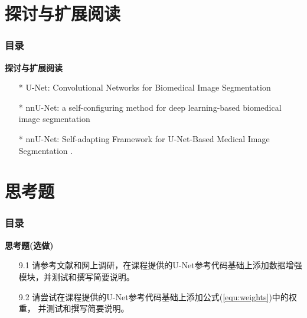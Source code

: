 \documentclass{beamer}%
\begin{document}
\section{探讨与扩展阅读}
\begin{frame}[allowframebreaks]
    \frametitle{\textsc{目录}} \vspace{-0.3cm}
    \begin{spacing}{0.0}
    \end{spacing}   %
\end{frame}


\begin{frame}[allowframebreaks]
    \vspace{-0.1cm}
    {\noindent\large\textbf{探讨与扩展阅读}}
    \vspace{0.4cm}
    \begin{itemize}
        \item[*] U-Net: Convolutional Networks for Biomedical Image Segmentation \citep{Unet2015Olaf}
        \item[*] nnU-Net: a self-configuring method for deep learning-based biomedical image segmentation \citep{Isensee2021NM}
        \item[*] nnU-Net: Self-adapting Framework for U-Net-Based Medical Image Segmentation \citep{Isensee2019}.
    \end{itemize}
\end{frame}




\section{思考题}
\begin{frame}[allowframebreaks]
    \frametitle{\textsc{目录}} \vspace{-0.3cm}
    \begin{spacing}{0.0}
    \end{spacing}   %
\end{frame}


\begin{frame}[allowframebreaks]
    \vspace{-0.1cm}
    {\noindent\large\textbf{思考题(选做)}}
    \vspace{0.4cm}
    \begin{itemize}
        \item[9.1] 请参考文献\citet{Unet2015Olaf}和网上调研，在课程提供的U-Net参考代码基础上添加数据增强模块，并测试和撰写简要说明。
        \item[9.2] 请尝试在课程提供的U-Net参考代码基础上添加公式(\ref{equ:weights})中的权重， 并测试和撰写简要说明。
    \end{itemize}
\end{frame}
\end{document}
